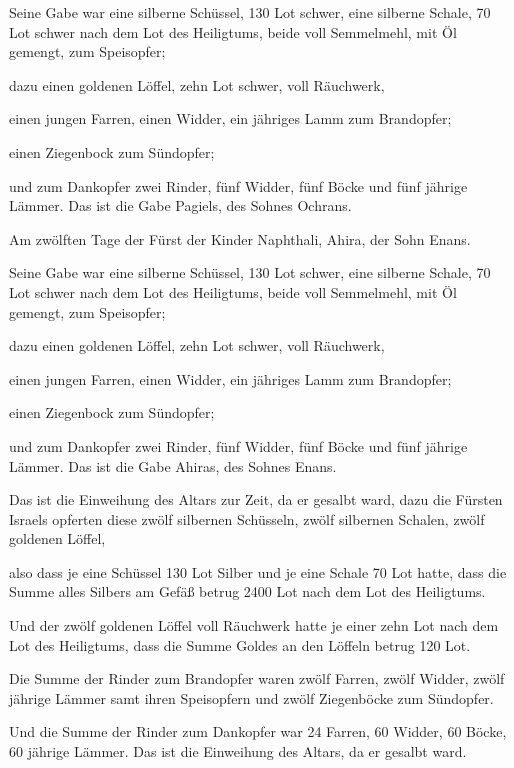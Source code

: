  Seine Gabe war eine silberne Schüssel, 130 Lot schwer,
eine silberne Schale, 70 Lot schwer nach dem Lot des Heiligtums, beide
voll Semmelmehl, mit Öl gemengt, zum Speisopfer;

 dazu einen goldenen Löffel, zehn Lot schwer, voll
Räuchwerk,

 einen jungen Farren, einen Widder, ein jähriges Lamm zum
Brandopfer;

 einen Ziegenbock zum Sündopfer;

 und zum Dankopfer zwei Rinder, fünf Widder, fünf Böcke und
fünf jährige Lämmer. Das ist die Gabe Pagiels, des Sohnes Ochrans.

 Am zwölften Tage der Fürst der Kinder Naphthali, Ahira,
der Sohn Enans.

 Seine Gabe war eine silberne Schüssel, 130 Lot schwer,
eine silberne Schale, 70 Lot schwer nach dem Lot des Heiligtums, beide
voll Semmelmehl, mit Öl gemengt, zum Speisopfer;

 dazu einen goldenen Löffel, zehn Lot schwer, voll
Räuchwerk,

 einen jungen Farren, einen Widder, ein jähriges Lamm zum
Brandopfer;

 einen Ziegenbock zum Sündopfer;

 und zum Dankopfer zwei Rinder, fünf Widder, fünf Böcke und
fünf jährige Lämmer. Das ist die Gabe Ahiras, des Sohnes Enans.

 Das ist die Einweihung des Altars zur Zeit, da er gesalbt
ward, dazu die Fürsten Israels opferten diese zwölf silbernen Schüsseln,
zwölf silbernen Schalen, zwölf goldenen Löffel,

 also dass je eine Schüssel 130 Lot Silber und je eine
Schale 70 Lot hatte, dass die Summe alles Silbers am Gefäß betrug 2400
Lot nach dem Lot des Heiligtums.

 Und der zwölf goldenen Löffel voll Räuchwerk hatte je
einer zehn Lot nach dem Lot des Heiligtums, dass die Summe Goldes an den
Löffeln betrug 120 Lot.

 Die Summe der Rinder zum Brandopfer waren zwölf Farren,
zwölf Widder, zwölf jährige Lämmer samt ihren Speisopfern und zwölf
Ziegenböcke zum Sündopfer.

 Und die Summe der Rinder zum Dankopfer war 24 Farren, 60
Widder, 60 Böcke, 60 jährige Lämmer. Das ist die Einweihung des Altars,
da er gesalbt ward.

